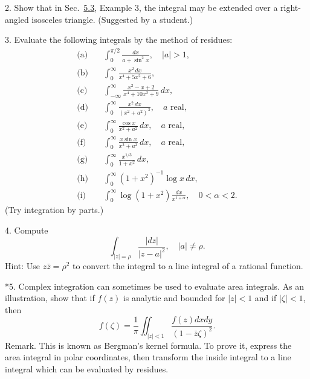 2. Show that in Sec.~\hyperref[sec:4.5.3]{5.3}, Example 3, the integral may be extended over a right-angled isosceles triangle. (Suggested by a student.)

3. Evaluate the following integrals by the method of residues:
\begin{align*}
\text{(a)}\quad &\int_0^{\pi/2}\frac{dx}{a+\sin^{2}x},\quad |a|>1,\\
\text{(b)}\quad &\int_0^{\infty}\frac{x^{2}\,dx}{x^{4}+5x^{2}+6},\\
\text{(c)}\quad &\int_{-\infty}^{\infty}\frac{x^{2}-x+2}{x^{4}+10x^{2}+9}\,dx,\\
\text{(d)}\quad &\int_0^{\infty}\frac{x^{2}\,dx}{(x^{2}+a^{2})^{3}},\quad a\text{ real},\\
\text{(e)}\quad &\int_0^{\infty}\frac{\cos x}{x^{2}+a^{2}}\,dx,\quad a\text{ real},\\
\text{(f)}\quad &\int_0^{\infty}\frac{x\sin x}{x^{2}+a^{2}}\,dx,\quad a\text{ real},\\
\text{(g)}\quad &\int_0^{\infty}\frac{x^{1/3}}{1+x^{2}}\,dx,\\
\text{(h)}\quad &\int_0^{\infty}(1+x^{2})^{-1}\log x\,dx,\\
\text{(i)}\quad &\int_0^{\infty}\log(1+x^{2})\frac{dx}{x^{1+\alpha}},\quad 0<\alpha<2.
\end{align*}
(Try integration by parts.)

4. Compute
\begin{equation*}
\int_ {| z | = \rho} \frac {| d z |}{| z - a | ^ {2}}, \quad | a | \neq \rho .
\end{equation*}
Hint: Use $z\bar{z} = \rho^{2}$ to convert the integral to a line integral of a rational function.

*5. Complex integration can sometimes be used to evaluate area integrals. As an illustration, show that if $f(z)$ is analytic and bounded for $|z| < 1$ and if $|\zeta| < 1$, then
\begin{equation*}
f (\zeta) = \frac {1}{\pi} \iint_ {| z | <   1} \frac {f (z) d x d y}{(1 - \bar {z} \zeta) ^ {2}}.
\end{equation*}
Remark. This is known as Bergman's kernel formula. To prove it, express the area integral in polar coordinates, then transform the inside integral to a line integral which can be evaluated by residues.


